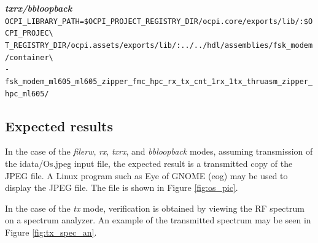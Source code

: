 \noindent\textbf{\textit{txrx/bbloopback}}\\
\verb|OCPI_LIBRARY_PATH=$OCPI_PROJECT_REGISTRY_DIR/ocpi.core/exports/lib/:$OCPI_PROJEC\| \\
\verb|T_REGISTRY_DIR/ocpi.assets/exports/lib/:../../hdl/assemblies/fsk_modem/container\| \\
\verb|-fsk_modem_ml605_ml605_zipper_fmc_hpc_rx_tx_cnt_1rx_1tx_thruasm_zipper_hpc_ml605/| \\
\pagebreak

\subsection{Expected results}
\noindent In the case of the \textit{filerw}, \textit{rx}, \textit{txrx}, and \textit{bbloopback} modes, assuming transmission of the idata/Os.jpeg input file, the expected result is a transmitted copy of the JPEG file. A Linux program such as Eye of GNOME (eog) may be used to display the JPEG file. The file is shown in Figure \ref{fig:os_pic}.\par\medskip
\noindent In the case of the \textit{tx} mode, verification is obtained by viewing the RF spectrum on a spectrum analyzer. An example of the transmitted spectrum may be seen in Figure \ref{fig:tx_spec_an}.\par\medskip
